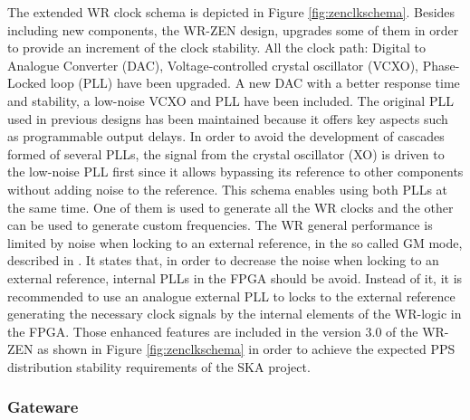 The extended WR clock schema is depicted in Figure \ref{fig:zenclkschema}.
Besides including new components, the WR-ZEN design, upgrades some of them
in order to provide an increment of the clock stability. All the clock path: Digital to Analogue Converter (DAC), Voltage-controlled crystal oscillator (VCXO), Phase-Locked loop (PLL) have been upgraded. A new DAC \cite{web:ad5541a_datasheet} with a better response time and stability, a low-noise VCXO \cite{web:cvhd950_datasheet} and PLL \cite{web:lmk03806_datasheet}  have been included.
The original PLL \cite{web:ad9516_datasheet} used in previous designs has been maintained because it offers key aspects such as programmable output delays. In order to avoid the development of cascades formed of several PLLs, the signal from the crystal oscillator (XO) is driven to the low-noise PLL first since it allows bypassing its reference to other components without adding noise to the reference. This schema enables using both PLLs at the same time. One of them is used to generate all the WR clocks and the other can be used to generate custom frequencies. The WR general performance is limited by noise when locking to an external reference, in the so called GM mode, described in \cite{Rizzi2016}. It states that, in order to decrease the noise when locking to an external reference, internal PLLs in the FPGA should be avoid. Instead of it, it is recommended to use an analogue external PLL to locks to the external reference generating the necessary clock signals by the internal elements of the WR-logic in the FPGA. Those enhanced features are included in the version 3.0 of the WR-ZEN as shown in Figure \ref{fig:zenclkschema} in order to achieve the expected PPS distribution stability requirements of the SKA project.


\subsubsection{Gateware} \label{subsec:gateware}


